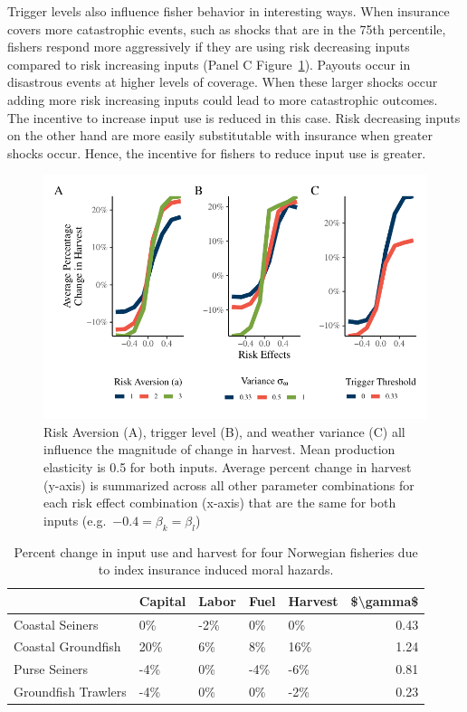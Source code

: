 \documentclass[
  letterpaper,
  DIV=11,
  numbers=noendperiod]{scrartcl}
\theoremstyle{plain}
\theoremstyle{plain}
\theoremstyle{remark}
\begin{document}
Trigger levels also influence fisher behavior in interesting ways. When
insurance covers more catastrophic events, such as shocks that are in
the 75th percentile, fishers respond more aggressively if they are using
risk decreasing inputs compared to risk increasing inputs (Panel C
Figure~\ref{fig-multi-para}). Payouts occur in disastrous events at
higher levels of coverage. When these larger shocks occur adding more
risk increasing inputs could lead to more catastrophic outcomes. The
incentive to increase input use is reduced in this case. Risk decreasing
inputs on the other hand are more easily substitutable with insurance
when greater shocks occur. Hence, the incentive for fishers to reduce
input use is greater.

\begin{figure}

{\centering \includegraphics{ibi-behavior_files/figure-pdf/fig-multi-para-1.pdf}

}

\caption{\label{fig-multi-para}Risk Aversion (A), trigger level (B), and
weather variance (C) all influence the magnitude of change in harvest.
Mean production elasticity is 0.5 for both inputs. Average percent
change in harvest (y-axis) is summarized across all other parameter
combinations for each risk effect combination (x-axis) that are the same
for both inputs (e.g.~\(-0.4=\beta_k=\beta_l\))}

\end{figure}

\hypertarget{tbl-nor}{}
\begin{longtable}[t]{lllllr}
\caption{\label{tbl-nor}Percent change in input use and harvest for four Norwegian fisheries due
to index insurance induced moral hazards. }\tabularnewline

\toprule
 & Capital & Labor & Fuel & Harvest & \$\textbackslash{}gamma\$\\
\midrule
Coastal Seiners & 0\% & -2\% & 0\% & 0\% & 0.43\\
Coastal Groundfish & 20\% & 6\% & 8\% & 16\% & 1.24\\
Purse Seiners & -4\% & 0\% & -4\% & -6\% & 0.81\\
Groundfish Trawlers & -4\% & 0\% & 0\% & -2\% & 0.23\\
\bottomrule
\end{longtable}
\end{document}
